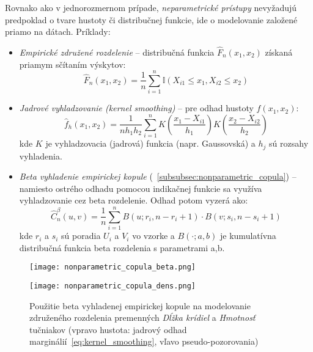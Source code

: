 Rovnako ako v jednorozmernom prípade, \textit{neparametrické prístupy} nevyžadujú predpoklad o tvare hustoty či distribučnej funkcie, ide o modelovanie založené priamo na dátach. Príklady:

\begin{itemize}
  \item \textit{Empirické združené rozdelenie} – distribučná funkcia $\hat{F}_n(x_1, x_2)$ získaná priamym sčítaním výskytov:
  \begin{equation}
  \hat{F}_n(x_1, x_2) = \frac{1}{n} \sum_{i=1}^{n} \mathbb{I}(X_{i1} \leq x_1, X_{i2} \leq x_2)
  \end{equation}
  \item \textit{Jadrové vyhladzovanie (kernel smoothing)} – pre odhad hustoty $f(x_1, x_2)$:
  \begin{equation}
  \hat{f}_h(x_1, x_2) = \frac{1}{n h_1 h_2} \sum_{i=1}^{n} K\left( \frac{x_1 - X_{i1}}{h_1} \right) K\left( \frac{x_2 - X_{i2}}{h_2} \right)
  \end{equation}
  kde $K$ je vyhladzovacia (jadrová) funkcia (napr. Gaussovská) a $h_j$ sú rozsahy vyhladenia.

  \item \textit{Beta vyhladenie empirickej kopule} (~\ref{subsubsec:nonparametric_copula}) – namiesto ostrého odhadu pomocou indikačnej funkcie sa využíva vyhladzovanie cez beta rozdelenie. Odhad potom vyzerá ako:
  \begin{equation}
    \hat{C}_n^{\beta}(u, v) = \frac{1}{n} \sum_{i=1}^n B(u; r_i, n - r_i + 1) \cdot B(v; s_i, n - s_i + 1)
  \end{equation}
  kde $r_i$ a $s_i$ sú poradia $U_i$ a $V_i$ vo vzorke a $B(\cdot; a,b)$ je kumulatívna distribučná funkcia beta rozdelenia s parametrami a,b.
  
\end{itemize}

\begin{figure}[H]
    \centering
    \begin{minipage}[t]{0.48\linewidth}
        \centering
        \texttt{[image: nonparametric\_copula\_beta.png]}
    \end{minipage}
    \hfill
    \begin{minipage}[t]{0.48\linewidth}
        \centering
        \texttt{[image: nonparametric\_copula\_dens.png]}
    \end{minipage}
    \caption{Použitie beta vyhladenej empirickej kopule na modelovanie združeného rozdelenia premenných \textit{Dĺžka krídiel} a \textit{Hmotnosť} tučniakov (vpravo hustota: jadrový odhad marginálií~\ref{eq:kernel_smoothing}, vľavo pseudo-pozorovania)}
    \label{fig:empcopula}
\end{figure}

